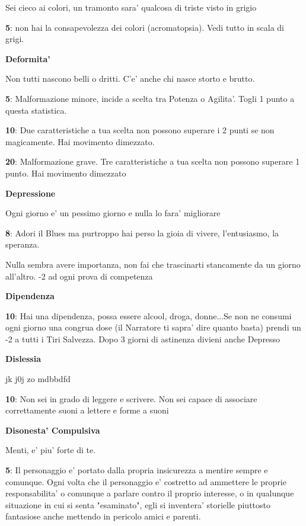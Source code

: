 \documentclass[a4paper,11pt,twoside,openany]{book}
\begin{document}
{Sei cieco ai colori, un tramonto sara' qualcosa di triste visto in grigio

\textbf{5}: non hai la consapevolezza dei colori (acromatopsia). Vedi tutto in scala di grigi.

\textbf{Deformita'}

Non tutti nascono belli o dritti. C'e' anche chi nasce storto e brutto.

\textbf{5}: Malformazione minore, incide a scelta tra Potenza o Agilita'. Togli 1 punto a questa statistica.

\textbf{10}: Due caratteristiche a tua scelta non possono superare i 2 punti se non magicamente. Hai movimento dimezzato.

\textbf{20}: Malformazione grave. Tre caratteristiche a tua scelta non possono superare 1 punto. Hai movimento dimezzato

\textbf{Depressione}

Ogni giorno e' un pessimo giorno e nulla lo fara' migliorare

\textbf{8}: Adori il Blues ma purtroppo hai perso la gioia di vivere, l'entusiasmo, la speranza.

Nulla sembra avere importanza, non fai che trascinarti stancamente da un giorno all'altro. -2 ad ogni prova di competenza

\textbf{Dipendenza}

\textbf{10}: Hai una dipendenza, possa essere alcool, droga, donne...Se non ne consumi ogni giorno una congrua dose (il Narratore ti sapra' dire quanto basta) prendi un -2 a tutti i Tiri Salvezza. Dopo 3 giorni di astinenza divieni anche Depresso

\textbf{Dislessia}

jk j0j zo mdbbdfd

\textbf{10}: Non sei in grado di leggere e scrivere. Non sei capace di associare correttamente suoni a lettere e forme a suoni

\textbf{Disonesta' Compulsiva}

Menti, e' piu' forte di te.

\textbf{5}: Il personaggio e' portato dalla propria insicurezza a mentire sempre e comunque. Ogni volta che il personaggio e' costretto ad ammettere le proprie responsabilita' o comunque a parlare contro il proprio interesse, o in qualunque situazione in cui si senta "esaminato", egli si inventera' storielle piuttosto fantasiose anche mettendo in pericolo amici e parenti.

}
\end{document}

